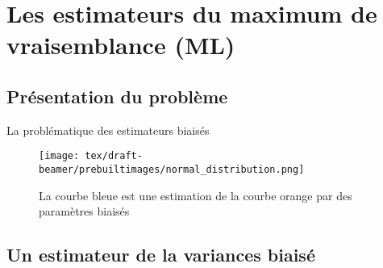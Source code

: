 \documentclass[unknownkeysallowed]{beamer}
\begin{document}
\section{Les estimateurs du maximum de vraisemblance (ML)}
\label{sec:introdcution}

\subsection{Présentation du problème}
\label{sub:un_premier_exemple}

\begin{frame}{La problématique des estimateurs biaisés}

\begin{figure}
    \centering
    \texttt{[image: tex/draft-beamer/prebuiltimages/normal\_distribution.png]}
    \caption{La courbe bleue est une estimation de la courbe orange par des paramètres biaisés}
    \label{fig:my_label}
\end{figure}
    
\end{frame}

\subsection{Un estimateur de la variances biaisé}
\label{sub:deuxiem_exmple}
\end{document}
